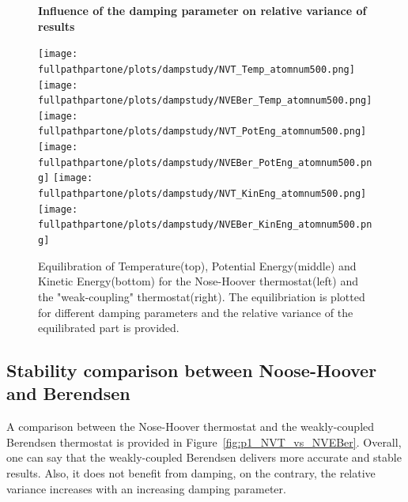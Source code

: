 \documentclass[10pt,a4paper]{report}
\def \fullpathpartone {/home/lukas/Desktop/project/independence/atomistic_modeling/exam/1_three-dimensional_atomic_system}
\newcommand*{\figuretitle}[1]{%
    {\centering%
    \textbf{#1}%
    \par\medskip}%
}
\begin{document}
\begin{center}
\begin{figure}[h]
\figuretitle{Influence of the damping parameter on relative variance of results}
\texttt{[image: \\fullpathpartone/plots/dampstudy/NVT\_Temp\_atomnum500.png]}~
\texttt{[image: \\fullpathpartone/plots/dampstudy/NVEBer\_Temp\_atomnum500.png]}
\texttt{[image: \\fullpathpartone/plots/dampstudy/NVT\_PotEng\_atomnum500.png]}~
\texttt{[image: \\fullpathpartone/plots/dampstudy/NVEBer\_PotEng\_atomnum500.png]}
\texttt{[image: \\fullpathpartone/plots/dampstudy/NVT\_KinEng\_atomnum500.png]}~
\texttt{[image: \\fullpathpartone/plots/dampstudy/NVEBer\_KinEng\_atomnum500.png]}
\caption[Influence of the damping parameter on relative variance of results]{Equilibration of Temperature(top), Potential Energy(middle) and Kinetic Energy(bottom) for the Nose-Hoover thermostat(left) and the "weak-coupling" thermostat(right). The equilibriation is plotted for different damping parameters and the relative variance of the equilibrated part is provided.}
\label{fig:p1_equilibriation}
\end{figure}
\end{center}


\subsection{Stability comparison between Noose-Hoover and Berendsen}
A comparison between the Nose-Hoover thermostat and the weakly-coupled Berendsen thermostat is provided in Figure~\ref{fig:p1_NVT_vs_NVEBer}.
Overall, one can say that the weakly-coupled Berendsen delivers more accurate and stable results. Also, it does not benefit from damping, on the contrary, the relative variance increases with an increasing damping parameter.
\end{document}
